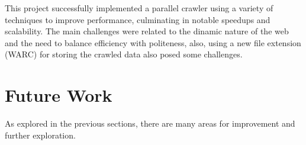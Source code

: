 This project successfully implemented a parallel crawler using a variety of techniques to improve performance, culminating in notable speedups and scalability. The main challenges were related to the dinamic nature of the web and the need to balance efficiency with politeness, also, using a new file extension (WARC) for storing the crawled data also posed some challenges.

\section{Future Work}

As explored in the previous sections, there are many areas for improvement and further exploration.









